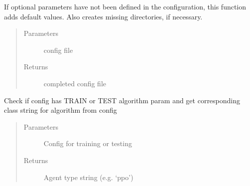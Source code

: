 \documentclass[letterpaper,10pt,english]{sphinxmanual}
\begin{document}
\begin{fulllineitems}
\sphinxAtStartPar
If optional parameters have not been defined in the configuration, this function adds default values. Also creates
missing directories, if necessary.
\begin{quote}\begin{description}
\item[{Parameters}] \leavevmode
\sphinxAtStartPar
{} \textendash{} config file

\item[{Returns}] \leavevmode
\sphinxAtStartPar
completed config file

\end{description}\end{quote}

\end{fulllineitems}



\begin{fulllineitems}
\sphinxAtStartPar
Check if config has TRAIN or TEST algorithm param and get corresponding class string for algorithm from config
\begin{quote}\begin{description}
\item[{Parameters}] \leavevmode
\sphinxAtStartPar
{} \textendash{} Config for training or testing

\item[{Returns}] \leavevmode
\sphinxAtStartPar
Agent type string (e.g. ‘ppo’)

\end{description}\end{quote}

\end{fulllineitems}
\end{document}
